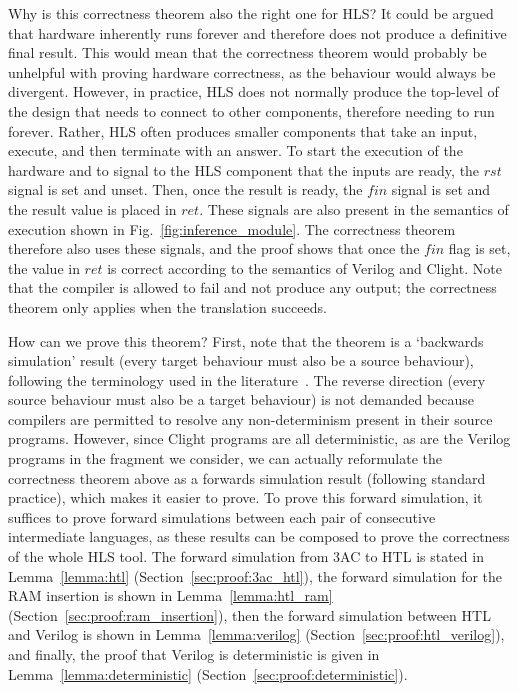Why is this correctness theorem also the right one for HLS? It could be argued
that hardware inherently runs forever and therefore does not produce a
definitive final result.  This would mean that the \compcert{} correctness
theorem would probably be unhelpful with proving hardware correctness, as the
behaviour would always be divergent.  However, in practice, HLS does not
normally produce the top-level of the design that needs to connect to other
components, therefore needing to run forever.  Rather, HLS often produces
smaller components that take an input, execute, and then terminate with an
answer.  To start the execution of the hardware and to signal to the HLS
component that the inputs are ready, the $\mathit{rst}$ signal is set and unset.
Then, once the result is ready, the $\mathit{fin}$ signal is set and the result
value is placed in $\mathit{ret}$.  These signals are also present in the
semantics of execution shown in Fig.~\ref{fig:inference_module}.  The
correctness theorem therefore also uses these signals, and the proof shows that
once the $\mathit{fin}$ flag is set, the value in $\mathit{ret}$ is correct
according to the semantics of Verilog and Clight.  Note that the compiler is
allowed to fail and not produce any output; the correctness theorem only applies
when the translation succeeds.

How can we prove this theorem? First, note that the theorem is a `backwards
simulation' result (every target behaviour must also be a source behaviour),
following the terminology used in the \compcert{}
literature~\cite{leroy09_formal_verif_realis_compil}. The reverse direction
(every source behaviour must also be a target behaviour) is not demanded because
compilers are permitted to resolve any non-determinism present in their source
programs. However, since Clight programs are all deterministic, as are the
Verilog programs in the fragment we consider, we can actually reformulate the
correctness theorem above as a forwards simulation result (following standard
\compcert{} practice), which makes it easier to prove.  To prove this forward
simulation, it suffices to prove forward simulations between each pair of
consecutive intermediate languages, as these results can be composed to prove
the correctness of the whole HLS tool.  The forward simulation from 3AC to HTL
is stated in Lemma~\ref{lemma:htl} (Section~\ref{sec:proof:3ac_htl}), the
forward simulation for the RAM insertion is shown in Lemma~\ref{lemma:htl_ram}
(Section~\ref{sec:proof:ram_insertion}), then the forward simulation between HTL
and Verilog is shown in Lemma~\ref{lemma:verilog}
(Section~\ref{sec:proof:htl_verilog}), and finally, the proof that Verilog is
deterministic is given in Lemma~\ref{lemma:deterministic}
(Section~\ref{sec:proof:deterministic}).

